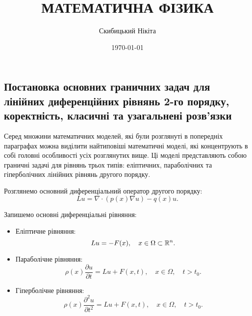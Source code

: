 

\title{{\Huge МАТЕМАТИЧНА ФІЗИКА}}
\author{Скибицький Нікіта}
\date{\today}





\tableofcontents

\setcounter{section}{3}
\setcounter{subsection}{7}

\subsection{Постановка основних граничних задач для лінійних диференційних рівнянь 2-го порядку, коректність, класичні та узагальнені розв'язки}

Серед множини математичних моделей, які були розглянуті в попередніх параграфах можна виділити найтиповіші математичні моделі, які концентрують в собі головні особливості усіх розглянутих вище. Ці моделі представляють собою граничні задачі для рівнянь трьох типів: еліптичних, параболічних та гіперболічних лінійних рівнянь другого порядку. \medskip

Розглянемо основний диференціальний оператор другого порядку:
\begin{equation}
    L u = \nabla \cdot (p(x) \nabla u) - q(x) u.
\end{equation}

Запишемо основні диференціальні рівняння:
\begin{itemize}
    \item Еліптичне рівняння:
    \begin{equation}
        \label{eq:elliptic-differential-equation}
        L u = - F(x), \quad x \in \Omega \subset \mathbb{R}^n.
    \end{equation}
    \item Параболічне рівняння:
    \begin{equation}
        \label{eq:parabolic-differential-equation}
        \rho(x) \frac{\partial u}{\partial t} = L u + F(x, t), \quad x \in \Omega, \quad t > t_0.
    \end{equation}
    \item Гіперболічне рівняння:
    \begin{equation}
        \label{eq:hyperbolic-differential-equation}
        \rho(x) \frac{\partial^2 u}{\partial t^2} = L u + F(x, t), \quad x \in \Omega, \quad t > t_0.
    \end{equation}
\end{itemize}

